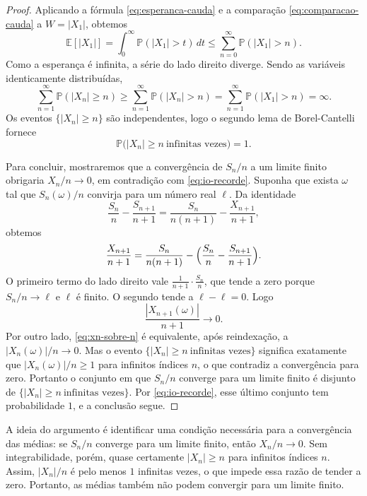 \documentclass[12pt,portuguese]{article}
\theoremstyle{definition}
\theoremstyle{plainexercise}
\theoremstyle{starredexercise}
\theoremstyle{definition}
\begin{document}
\begin{proof}
Aplicando a fórmula \eqref{eq:esperanca-cauda} e a comparação
\eqref{eq:comparacao-cauda} a $W=|X_1|$, obtemos
\begin{equation}\label{eq:cauda-serie}
\mathbb{E}[|X_1|]
=
\int_0^{\infty}\mathbb{P}(|X_1|>t)\,dt
\leqslant
\sum_{n=0}^{\infty}\mathbb{P}(|X_1|>n).
\end{equation}
Como a esperança é infinita, a série do lado direito diverge. Sendo as
variáveis identicamente distribuídas,
\[
\sum_{n=1}^{\infty}\mathbb{P}(|X_n|\geqslant n)
\geqslant
\sum_{n=1}^{\infty}\mathbb{P}(|X_n|>n)
=
\sum_{n=1}^{\infty}\mathbb{P}(|X_1|>n)
=
\infty.
\]
Os eventos $\{|X_n|\geqslant n\}$ são independentes, logo o segundo lema de
Borel-Cantelli fornece
\begin{equation}\label{eq:io-recorde}
\mathbb{P}\bigl(|X_n|\geqslant n\ \text{infinitas vezes}\bigr)=1.
\end{equation}

Para concluir, mostraremos que a convergência de $S_n/n$ a um limite finito
obrigaria $X_n/n\to0$, em contradição com \eqref{eq:io-recorde}.
Suponha que exista $\omega$ tal que $S_n(\omega)/n$ convirja para um número
real $\ell$. Da identidade
\[
\frac{S_n}{n}-\frac{S_{n+1}}{n+1}
=
\frac{S_n}{n(n+1)}-\frac{X_{n+1}}{n+1},
\]
obtemos
\[
\frac{X_{n+1}}{n+1}
=
\frac{S_n}{n(n+1)}-\Bigl(\frac{S_n}{n}-\frac{S_{n+1}}{n+1}\Bigr).
\]
O primeiro termo do lado direito vale
$\frac{1}{n+1}\cdot\frac{S_n}{n}$, que tende a zero porque $S_n/n\to\ell$ e
$\ell$ é finito. O segundo tende a $\ell-\ell=0$. Logo
\begin{equation}\label{eq:xn-sobre-n}
\frac{|X_{n+1}(\omega)|}{n+1}\longrightarrow0.
\end{equation}
Por outro lado, \eqref{eq:xn-sobre-n} é equivalente, após reindexação, a
$|X_n(\omega)|/n\to0$. Mas o evento
$\{|X_n|\geqslant n\ \text{infinitas vezes}\}$ significa exatamente que
$|X_n(\omega)|/n\geqslant1$ para infinitos índices $n$, o que contradiz a
convergência para zero. Portanto o conjunto em que $S_n/n$
converge para um limite finito é disjunto de
$\{|X_n|\geqslant n\ \text{infinitas vezes}\}$. Por \eqref{eq:io-recorde}, esse
último conjunto tem probabilidade $1$, e a conclusão segue.
\end{proof}

A ideia do argumento é identificar uma condição necessária para a
convergência das médias: se $S_n/n$ converge para um limite finito, então
$X_n/n\to0$. Sem integrabilidade, porém, quase certamente
$|X_n|\geqslant n$ para infinitos índices $n$. Assim, $|X_n|/n$ é pelo menos
$1$ infinitas vezes, o que impede essa razão de tender a zero. Portanto, as
médias também não podem convergir para um limite finito.
\end{document}
